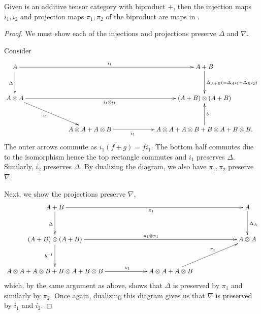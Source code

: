 \begin{lemma}\label{lem:biproduct-injections-and-projections-are-in-cfrob}
  Given \X is an additive tensor category with biproduct $+$, then the injection maps $i_1,i_2$ and
  projection maps $\pi_1,\pi_2$ of the biproduct are maps in \CFrob.
\end{lemma}
\begin{proof}
  We  must show each of the injections and projections preserve $\Delta$ and $\nabla$.

  Consider
  \[
     \xymatrix@C+40pt@R+10pt{
       A \ar[d]_{\Delta} \ar[rr]^{i_1} & &A+B \ar[d]^{\Delta_{A+B}(=\Delta_A i_1 + \Delta_B i_2)}\\
       A\*A \ar[rr]_{i_1\*i_1} \ar[dr]_(.425){i_1} & & (A+B)\*(A+B)\\
       &A\*A+A\*B \ar[r]_(.375){i_1} & A\*A+A\*B+B\*A+B\*B \ar[u]_{b}.
     }
  \]
  The outer arrows commute as $i_1(f+g) = f i_1$. The bottom half commutes due to the isomorphism
  hence the top rectangle commutes and $i_1$ preserves $\Delta$.  Similarly, $i_2$ preserves
  $\Delta$. By dualizing the diagram, we also have $\pi_1, \pi_2$ preserve $\nabla$.

  Next, we show the projections preserve $\nabla$,
  \[
    \xymatrix@C+40pt@R+10pt{
       A+B \ar[rr]_{\pi_1}\ar[d]_{\Delta}& & A\ar[d]^{\Delta_A}\\
        (A+B)\*(A+B)  \ar[rr]^{\pi_1\*\pi_1} \ar[d]_{b^{-1}}  & &A\*A\\
       {A\*A+A\*B+B\*A+B\*B}  \ar[r]^(.625){\pi_1}  &A\*A+A\*B \ar[ur]^(.575){\pi_1}
     }
  \]
  which, by the same argument as above, shows that $\Delta$ is preserved by $\pi_1$ and similarly by
  $\pi_2$. Once again, dualizing  this diagram gives us that $\nabla$ is preserved by $i_1$ and $i_2$.
\end{proof}

